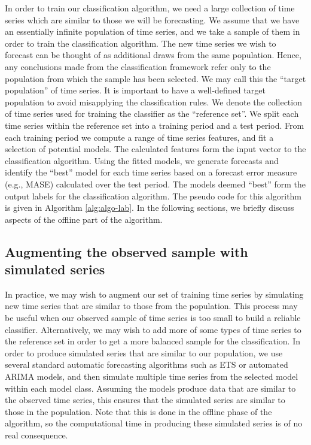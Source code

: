 \documentclass[11pt,a4paper,]{article}
\theoremstyle{definition}
\theoremstyle{definition}
\theoremstyle{definition}
\theoremstyle{remark}
\begin{document}
In order to train our classification algorithm, we need a large
collection of time series which are similar to those we will be
forecasting. We assume that we have an essentially infinite population
of time series, and we take a sample of them in order to train the
classification algorithm. The new time series we wish to forecast can be
thought of as additional draws from the same population. Hence, any
conclusions made from the classification framework refer only to the
population from which the sample has been selected. We may call this the
``target population'' of time series. It is important to have a
well-defined target population to avoid misapplying the classification
rules. We denote the collection of time series used for training the
classifier as the ``reference set''. We split each time series within
the reference set into a training period and a test period. From each
training period we compute a range of time series features, and fit a
selection of potential models. The calculated features form the input
vector to the classification algorithm. Using the fitted models, we
generate forecasts and identify the ``best'' model for each time series
based on a forecast error measure (e.g., MASE) calculated over the test
period. The models deemed ``best'' form the output labels for the
classification algorithm. The pseudo code for this algorithm is given in
Algorithm \autoref{alg:algo-lab}. In the following sections, we briefly
discuss aspects of the offline part of the algorithm.

\subsection{Augmenting the observed sample with simulated
series}\label{augmenting-the-observed-sample-with-simulated-series}

In practice, we may wish to augment our set of training time series by
simulating new time series that are similar to those from the
population. This process may be useful when our observed sample of time
series is too small to build a reliable classifier. Alternatively, we
may wish to add more of some types of time series to the reference set
in order to get a more balanced sample for the classification. In order
to produce simulated series that are similar to our population, we use
several standard automatic forecasting algorithms such as ETS or
automated ARIMA models, and then simulate multiple time series from the
selected model within each model class. Assuming the models produce data
that are similar to the observed time series, this ensures that the
simulated series are similar to those in the population. Note that this
is done in the offline phase of the algorithm, so the computational time
in producing these simulated series is of no real consequence.
\end{document}
